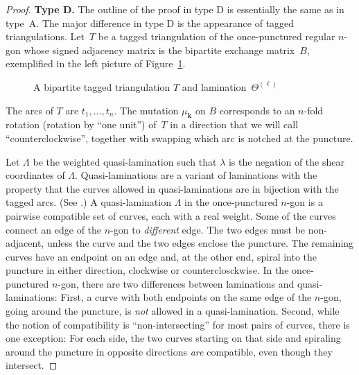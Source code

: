 \documentclass{amsart}
\theoremstyle{definition}
\theoremstyle{remark}
\numberwithin{equation}{section}
\newcommand{\0}{{\mathbf{0}}}
\newcommand{\kk}{{\boldsymbol{k}}}
\begin{document}
\begin{proof}
\noindent
\textbf{Type D.}
The outline of the proof in type D is essentially the same as in type~A.
The major difference in type D is the appearance of tagged triangulations.
Let~$T$ be a tagged triangulation of the once-punctured regular $n$-gon whose signed adjacency matrix is the bipartite exchange matrix~$B$, exemplified in the left picture of Figure~\ref{d T fig}.
\begin{figure}
\qquad
{}
\caption{A bipartite tagged triangulation $T$ and lamination~$\Theta^{(\ell)}$}
\label{d T fig}
\end{figure}
The arcs of $T$ are $t_1,\ldots,t_n$.
The mutation $\mu_\kk$ on $B$ corresponds to an $n$-fold rotation (rotation by ``one unit'') of~$T$ in a direction that we will call ``counterclockwise'', together with swapping which arc is notched at the puncture.

Let $\Lambda$ be the weighted quasi-lamination such that $\lambda$ is the negation of the shear coordinates of $\Lambda$.
Quasi-laminations are a variant of laminations with the property that the curves allowed in quasi-laminations are in bijection with the tagged arcs.
(See \cite[Section~4]{unisurface}.)
A quasi-lamination $\Lambda$ in the once-punctured $n$-gon is a pairwise compatible set of curves, each with a real weight.
Some of the curves connect an edge of the $n$-gon to \emph{different} edge.
The two edges must be non-adjacent, unless the curve and the two edges enclose the puncture.
The remaining curves have an endpoint on an edge and, at the other end, spiral into the puncture in either direction, clockwise or counterclosckwise.
In the once-punctured $n$-gon, there are two differences between laminations and quasi-laminations:
First, a curve with both endpoints on the same edge of the $n$-gon, going around the puncture, is \emph{not} allowed in a quasi-lamination.
Second, while the notion of compatibility is ``non-intersecting'' for most pairs of curves, there is one exception:  
For each side, the two curves starting on that side and spiraling around the puncture in opposite directions \emph{are} compatible, even though they intersect.


\end{proof}
\end{document}
